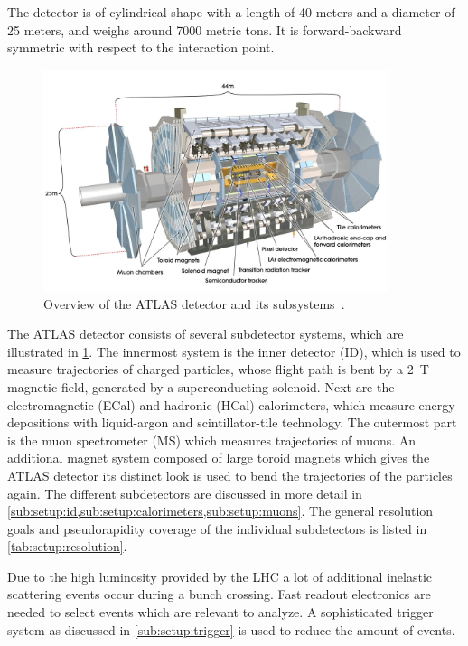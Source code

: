The detector is of cylindrical shape with a length of 40 meters and a diameter of 25 meters, and weighs around 7000 metric tons.
It is forward-backward symmetric with respect to the interaction point.

\begin{figure}[htb]
    \centering
    \includegraphics[width=0.9\textwidth]{./figures/setup/atlas.jpg}
    \caption{Overview of the ATLAS detector and its subsystems~\cite{ATLAS}.}\label{fig:setup:atlas}
\end{figure}

The ATLAS detector consists of several subdetector systems, which are illustrated in \cref{fig:setup:atlas}.
The innermost system is the inner detector (ID), which is used to measure trajectories
of charged particles, whose flight path is bent by a \SI{2}{\tesla} magnetic field, generated by a superconducting solenoid.
Next are the electromagnetic (ECal) and hadronic (HCal) calorimeters, which measure energy depositions with
liquid-argon and scintillator-tile technology.
The outermost part is the muon spectrometer (MS) which measures trajectories of muons.
An additional magnet system composed of large toroid magnets which gives the ATLAS detector its distinct look is used
to bend the trajectories of the particles again.
The different subdetectors are discussed in more detail in
\cref{sub:setup:id,sub:setup:calorimeters,sub:setup:muons}.
The general resolution goals and pseudorapidity coverage of the individual subdetectors is listed in \cref{tab:setup:resolution}.

Due to the high luminosity provided by the LHC a lot of additional inelastic scattering events occur during
a bunch crossing.
Fast readout electronics are needed to select events which are relevant to analyze.
A sophisticated trigger system as discussed in \cref{sub:setup:trigger} is used to reduce the amount of events.

